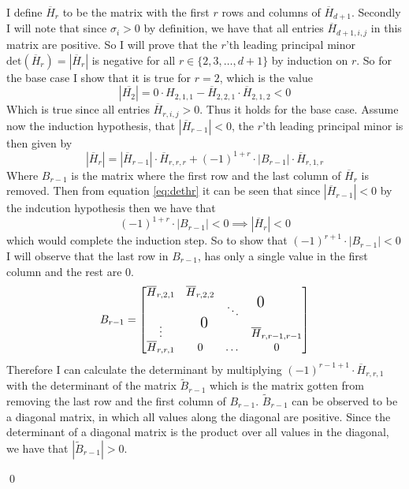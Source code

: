 \documentclass[a4paper,12pt]{article}
\renewenvironment{proof}{{\textit{Proof} \\}}{\qed}
\begin{document}
\begin{proof}
I define $\overline{H}_{r}$ to be the matrix with the first $r$ rows and columns of $\overline{H}_{d+1}$. 
Secondly I will note that since $\sigma_i > 0$ by definition, we have that all entries $\overline{H}_{d+1,i,j}$ 
in this matrix are positive.
So I will prove that the $r$'th leading principal minor 
$\text{det}(\overline{H}_{r}) = |\overline{H}_{r}|$ is negative for all $r \in \{2,3,\dots,d+1\}$ by induction on $r$.
So for the base case I show that it is true for $r=2$, which is the value
\[
    |\overline{H_2}| = 0 \cdot H_{2,1,1} - \overline{H}_{2,2,1} \cdot \overline{H}_{2,1,2} < 0 
\]
Which is true since all entries $\overline{H}_{r,i,j} > 0$. Thus it holds for the base case.
Assume now the induction hypothesis, that $|\overline{H}_{r-1}| < 0$, the $r$'th leading principal minor is 
then given by
\begin{equation}
\label{eq:dethr}
|\overline{H}_{r}| = |\overline{H}_{r-1}| \cdot \overline{H}_{r,r,r} + (-1)^{1 + r} \cdot |B_{r-1}| \cdot \overline{H}_{r,1,r}
\end{equation}
Where $B_{r-1}$ is the matrix where the first row and the last column of $\overline{H}_{r}$ is removed.
Then from equation \eqref{eq:dethr} it can be seen that since $|\overline{H}_{r-1}| < 0$ by the indcution hypothesis
then we have that 
\begin{equation}
\label{eq:inducstep}
(-1)^{1+r} \cdot |B_{r-1}| < 0 \implies |\overline{H}_{r}| < 0
\end{equation}
which would complete the induction step.
So to show that $(-1)^{r+1} \cdot |B_{r-1}| < 0$ I will observe that the last row in $B_{r-1}$, has only a single value in the first column
and the rest are $0$.
\[
    B_{r-1} =
    \begin{bmatrix}
    \overline{H}_{r,2,1} & \overline{H}_{r,2,2} &  & \multirow{2.5}{0.5in}{\Large 0}  \\
    & \multirow{2.5}{-0.5in}{\Large 0}  & \ddots \\
    \vdots &  & & \overline{H}_{r,r-1,r-1} \\
    \overline{H}_{r,r,1} & 0 & \dots &  0
    \end{bmatrix}
\]
Therefore I can calculate the determinant by multiplying $(-1)^{r-1 + 1} \cdot \overline{H}_{r,r,1}$ with the determinant
of the matrix $\tilde{B}_{r-1}$ which is the matrix gotten from removing the last row and the first column of $B_{r-1}$.
$\tilde{B}_{r-1}$ can be observed to be a diagonal matrix, in which all values along the diagonal are positive. Since
the determinant of a diagonal matrix is the product over all values in the diagonal, we have that $|\tilde{B}_{r-1}| > 0$.

\end{proof}
\end{document}
